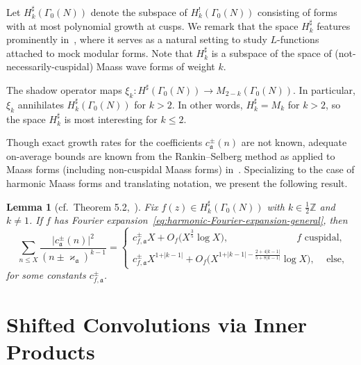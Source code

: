 \documentclass[11pt,reqno]{amsart}
\theoremstyle{plain}
\newtheorem{lemma}[theorem]{Lemma}
\theoremstyle{definition}
\numberwithin{equation}{section}
\begin{document}
Let $H^\sharp_k(\Gamma_0(N))$ denote the subspace of $H_k^!(\Gamma_0(N))$ consisting of forms with at most polynomial growth at cusps. We remark that the space $H_k^\sharp$ features prominently in~\cite{ShankhadharSingh22}, where it serves as a natural setting to study $L$-functions attached to mock modular forms. Note that $H_k^\sharp$ is a subspace of the space of (not-necessarily-cuspidal) Maass wave forms of weight $k$.

The shadow operator maps $\xi_k : H^\sharp(\Gamma_0(N)) \to M_{2-k}(\Gamma_0(N))$. In particular, $\xi_k$ annihilates $H_k^\sharp(\Gamma_0(N))$ for $k> 2$. In other words, $H_k^\sharp = M_k$ for $k> 2$, so the space $H_k^\sharp$ is most interesting for $k \leq 2$.
 
Though exact growth rates for the coefficients $c_\mathfrak{a}^\pm(n)$ are not known, adequate on-average bounds are known from the Rankin--Selberg method as applied to Maass forms (including non-cuspidal Maass forms) in~\cite{Muller95}. Specializing to the case of harmonic Maass forms and translating notation, we present the following result.

\begin{lemma}[cf.~Theorem 5.2,~\cite{Muller95}] \label{lem:Muller-coefficient-averages}
Fix $f(z) \in H_k^\sharp(\Gamma_0(N))$ with $k \in \frac{1}{2} \mathbb{Z}$ and $k \neq 1$. If $f$ has Fourier expansion~\eqref{eq:harmonic-Fourier-expansion-general}, then
\[\,\,\, %
	\sum_{n \leq X} \frac{\vert c_\mathfrak{a}^{\pm}(n) \vert^2}{(n \pm \varkappa_\mathfrak{a})^{k-1}}
		= \begin{cases}
			c_{f,\mathfrak{a}}^\pm X + O_f\big(X^{\frac{3}{5}} \log X\big),  
				\qquad \qquad \qquad \quad f \text{ cuspidal}, \\
			c_{f,\mathfrak{a}}^\pm X^{1+ \vert k -1 \vert}
		+ O_f\big( X^{1 + \vert k-1 \vert - \frac{2 + 4 \vert k-1 \vert}{5+ 8 \vert k -1 \vert}} \log X\big),
			\quad \, \text{else},
			\end{cases}
\]
for some constants $c_{f,\mathfrak{a}}^\pm$.
\end{lemma}


\section{Shifted Convolutions via Inner Products}  \label{sec:unfolding}
\end{document}
